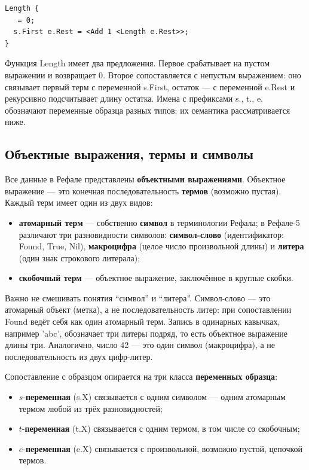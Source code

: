\documentclass[14pt, russian]{scrartcl}
\renewcommand{\emph}[1]{#1}
\newcommand{\enq}[1]{\enquote{#1}}
\newcommand{\prog}[1]{{\ttfamily\small#1}}
\begin{document}
\begin{lstlisting}[language=Refal,caption={Функция подсчёта длины выражения},label={lst:length}]
Length {
   = 0;
  s.First e.Rest = <Add 1 <Length e.Rest>>;
}
\end{lstlisting}

Функция \prog{Length} имеет два предложения. Первое срабатывает на пустом
выражении и возвращает \prog{0}. Второе сопоставляется с непустым выражением:
оно связывает первый терм с переменной \prog{s.First}, остаток --- с
переменной \prog{e.Rest} и рекурсивно подсчитывает длину остатка.
Имена с префиксами \prog{s.}, \prog{t.}, \prog{e.} обозначают переменные
образца разных типов; их семантика рассматривается ниже.

\subsection{Объектные выражения, термы и символы}

Все данные в Рефале представлены \textbf{объектными выражениями}.
Объектное выражение --- это конечная последовательность \textbf{термов}
(возможно пустая). Каждый терм имеет один из двух видов:

\begin{itemize}
  \item \textbf{атомарный терм} --- собственно \textbf{символ} в
        терминологии Рефала; в Рефале-5 различают три разновидности
        символов: \textbf{символ-слово} (идентификатор: \prog{Found},
        \prog{True}, \prog{Nil}), \textbf{макроцифра} (целое число
        произвольной длины) и \textbf{литера} (один знак строкового
        литерала);
  \item \textbf{скобочный терм} --- объектное выражение, заключённое в
        круглые скобки.
\end{itemize}

Важно не смешивать понятия \enq{символ} и \enq{литера}. Символ-слово ---
это атомарный объект (метка), а не последовательность литер: при
сопоставлении \prog{Found} ведёт себя как один атомарный терм. Запись в
одинарных кавычках, например \prog{'abc'}, обозначает три литеры подряд,
то есть объектное выражение длины три. Аналогично, число \prog{42} --- это
один символ (макроцифра), а не последовательность из двух цифр-литер.

Сопоставление с образцом опирается на три класса \textbf{переменных
образца}:

\begin{itemize}
  \item \(s\)-\textbf{переменная} (\prog{s.X}) связывается с одним
        \emph{символом} --- одним атомарным термом любой из трёх
        разновидностей;
  \item \(t\)-\textbf{переменная} (\prog{t.X}) связывается с одним
        \emph{термом}, в том числе со скобочным;
  \item \(e\)-\textbf{переменная} (\prog{e.X}) связывается с произвольной,
        возможно пустой, цепочкой термов.
\end{itemize}
\end{document}
